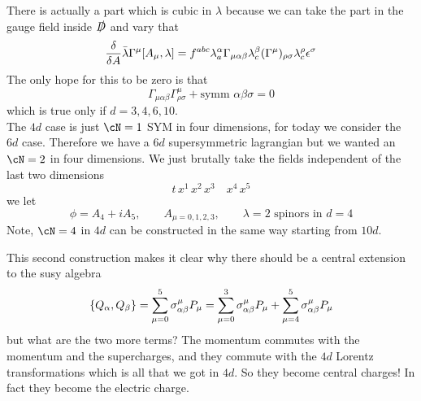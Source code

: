 \documentclass[11pt]{article}
\theoremstyle{definition}
\numberwithin{equation}{section}
\begin{document}
There is actually a part which is cubic in $\lambda$ because we can take the part in the gauge field inside $\slashed{D}$ and vary that
\begin{equation}
	\frac{\delta}{\delta A}\bar\lambda\Gamma^{\mu}\comm{A_{\mu}}{\lambda}=f^{abc}\lambda^{\alpha}_{a}\Gamma_{\mu\alpha\beta}\lambda^{\beta}_{c}(\Gamma^{\mu})_{\rho\sigma}\lambda_{c}^{\rho}\epsilon^{\sigma}
\end{equation}
The only hope for this to be zero is that
\begin{equation}
	\Gamma_{\mu\alpha\beta}\Gamma^{\mu}_{\rho\sigma}+\text{symm }\alpha\beta\sigma=0
\end{equation}
which is true only if $d=3,4,6,10$.\\
The $4d$ case is just $\cN=1$ SYM in four dimensions, for today we consider the $6d$ case. Therefore we have a $6d$ supersymmetric lagrangian but we wanted an $\cN=2$ in four dimensions. We just brutally take the fields independent of the last two dimensions
\begin{equation}
	t\,x^{1}\,x^{2}\,x^{3}\quad x^{4}\,x^{5}
\end{equation}
we let
\begin{equation}
	\phi=A_{4}+iA_{5},\qquad A_{\mu=0,1,2,3},\qquad \lambda=2\text{ spinors in }d=4 
\end{equation}
Note, $\cN=4$ in $4d$ can be constructed in the same way starting from $10d$.

This second construction makes it clear why there should be a central extension to the susy algebra
\begin{equation}
	\acomm{Q_{\alpha}}{Q_{\beta}}=\sum_{\mu=0}^{5}\sigma_{\alpha\beta}^{\mu}P_{\mu}=\sum_{\mu=0}^{3}\sigma_{\alpha\beta}^{\mu}P_{\mu}+\sum_{\mu=4}^{5}\sigma_{\alpha\beta}^{\mu}P_{\mu}
\end{equation}
but what are the two more terms? The momentum commutes with the momentum and the supercharges, and they commute with the $4d$ Lorentz transformations which is all that we got in $4d$. So they become central charges! In fact they become the electric charge.
\end{document}

